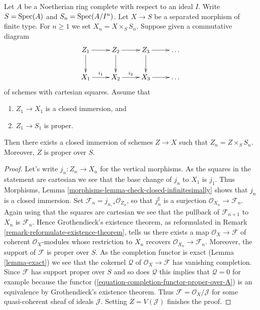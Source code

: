 \begin{lemma}
\label{lemma-algebraize-formal-closed-subscheme}
Let $A$ be a Noetherian ring complete with respect to an ideal $I$.
Write $S = \mathop{\mathrm{Spec}}(A)$ and $S_n = \mathop{\mathrm{Spec}}(A/I^n)$.
Let $X \to S$ be a separated morphism of finite type.
For $n \geq 1$ we set $X_n = X \times_S S_n$.
Suppose given a commutative diagram
$$
\xymatrix{
Z_1 \ar[r] \ar[d] & Z_2 \ar[r] \ar[d] & Z_3 \ar[r] \ar[d] & \ldots \\
X_1 \ar[r]^{i_1} & X_2 \ar[r]^{i_2} & X_3 \ar[r] & \ldots
}
$$
of schemes with cartesian squares. Assume that
\begin{enumerate}
\item $Z_1 \to X_1$ is a closed immersion, and
\item $Z_1 \to S_1$ is proper.
\end{enumerate}
Then there exists a closed immersion of schemes $Z \to X$ such that
$Z_n = Z \times_S S_n$. Moreover, $Z$ is proper over $S$.
\end{lemma}

\begin{proof}
Let's write $j_n : Z_n \to X_n$ for the vertical morphisms.
As the squares in the statement are cartesian
we see that the base change of $j_n$ to $X_1$ is $j_1$.
Thus Morphisms, Lemma \ref{morphisms-lemma-check-closed-infinitesimally}
shows that $j_n$ is a closed immersion.
Set $\mathcal{F}_n = j_{n, *}\mathcal{O}_{Z_n}$, so that
$j_n^\sharp$ is a surjection $\mathcal{O}_{X_n} \to \mathcal{F}_n$.
Again using that the squares are cartesian we see that
the pullback of $\mathcal{F}_{n + 1}$ to $X_n$ is $\mathcal{F}_n$.
Hence Grothendieck's existence theorem, as reformulated in
Remark \ref{remark-reformulate-existence-theorem},
tells us there exists a map
$\mathcal{O}_X \to \mathcal{F}$
of coherent $\mathcal{O}_X$-modules whose restriction to
$X_n$ recovers $\mathcal{O}_{X_n} \to \mathcal{F}_n$.
Moreover, the support of $\mathcal{F}$ is proper over $S$.
As the completion functor is exact (Lemma \ref{lemma-exact})
we see that the cokernel $\mathcal{Q}$ of $\mathcal{O}_X \to \mathcal{F}$
has vanishing completion. Since $\mathcal{F}$ has support
proper over $S$ and so does $\mathcal{Q}$ this implies that
$\mathcal{Q} = 0$ for example because the functor
(\ref{equation-completion-functor-proper-over-A}) is an equivalence
by Grothendieck's existence theorem.
Thus $\mathcal{F} = \mathcal{O}_X/\mathcal{J}$
for some quasi-coherent sheaf of ideals $\mathcal{J}$.
Setting $Z = V(\mathcal{J})$ finishes the proof.
\end{proof}

